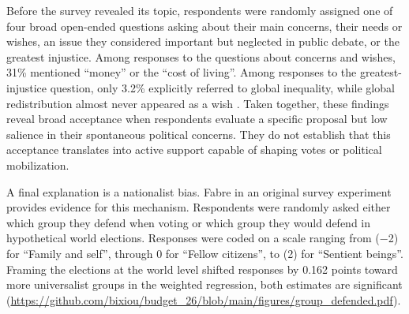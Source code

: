 Before the survey revealed its topic, respondents were randomly assigned one of four broad open-ended questions asking about their main concerns, their needs or wishes, an issue they considered important but neglected in public debate, or the greatest injustice. Among responses to the questions about concerns and wishes, 31\% mentioned ``money'' or the ``cost of living''. Among responses to the greatest-injustice question, only 3.2\% explicitly referred to global inequality, while global redistribution almost never appeared as a wish \citep[Figure 3]{fabre_public_2026}. Taken together, these findings reveal broad acceptance when respondents evaluate a specific proposal but low salience in their spontaneous political concerns. They do not establish that this acceptance translates into active support capable of shaping votes or political mobilization.


%



A final explanation is a nationalist bias. Fabre in an original survey experiment provides evidence for this mechanism. Respondents were randomly asked either which group they defend when voting or which group they would defend in hypothetical world elections. Responses were coded on a scale ranging from (−2) for ``Family and self'', through \(0\) for ``Fellow citizens'', to (2) for ``Sentient beings''. Framing the elections at the world level shifted responses by 0.162 points toward more universalist groups in the weighted regression, both estimates are significant (\url{https://github.com/bixiou/budget_26/blob/main/figures/group_defended.pdf}). 
